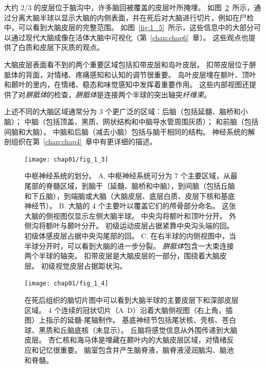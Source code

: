 \begin{proposition}[中枢神经系统的解剖学组织]
	\quad \quad 大约 2/3 的皮层位于脑沟中，许多脑回被覆盖的皮层叶所掩埋。
	如图~\ref{fig:1_4}~所示，通过分离大脑半球以显示大脑的内侧表面，并在死后对大脑进行切片，例如在尸检中，可以看到大脑皮层的完整范围。
	如图~\ref{fig:1_5}~所示，这些信息中的大部分可以通过现代大脑成像在活体大脑中可视化（第~\ref{chap:chap6}~章）。
	这些观点也提供了白质和皮层下灰质的观点。
	
	\quad \quad 大脑皮层表面看不到的两个重要区域包括扣带皮层和岛叶皮层。
	扣带皮层位于胼胝体的背面，对情绪、疼痛感知和认知的调节很重要。
	岛叶皮层埋在额叶、顶叶和颞叶的里内，在情绪、稳态和味觉感知中发挥着重要作用。
	这些内部视图还提供了对\textit{胼胝体}的检查，\textit{胼胝体}是连接两个半球的突出轴突\textit{纤维束}。
	
	\quad \quad 上述不同的大脑区域通常分为 3 个更广泛的区域：后脑（包括延髓、脑桥和小脑）；
	中脑（包括顶盖、黑质、网状结构和中脑导水管周围灰质）；
	和前脑（包括间脑和大脑）。
	中脑和后脑（减去小脑）包括与脑干相同的结构。
	神经系统的解剖组织在第~\ref{chap:chap4}~章中有更详细的描述。
		
\end{proposition}


\begin{figure}[htbp]
	\centering
	\texttt{[image: chap01/fig\_1\_3]}
	\caption{中枢神经系统的划分。
		A. 中枢神经系统可分为 7 个主要区域，从最尾部的脊髓区域，到脑干（延髓、脑桥和中脑），到间脑（包括丘脑和下丘脑），到端脑或大脑（大脑皮层、底层白质、皮层下核和基底神经节）。
		B. 大脑的 4 个主要叶以覆盖它们的颅骨部分命名。
		这张大脑的侧视图仅显示左侧大脑半球。
		中央沟将额叶和顶叶分开。
		外侧沟将额叶与颞叶分开。
		初级运动皮层占据紧靠中央沟头端的回。
		初级体感皮层占据中央沟尾部的回。
		C. 在右半球的内侧视图中，当半球分开时，可以看到大脑的进一步分裂。
		\textit{胼胝体}包含一大束连接两个半球的轴突。
		扣带皮层是大脑皮层的一部分，围绕着大脑皮层。
		初级视觉皮层占据距状沟。}
	\label{fig:1_3}
\end{figure}


\begin{figure}[htbp]
	\centering
	\texttt{[image: chap01/fig\_1\_4]}
	\caption{在死后组织的脑切片图中可以看到大脑半球的主要皮层下和深部皮层区域。
		4 个连续的冠状切片（A–D）沿着大脑侧视图（右上角，插图）上指示的延髓-尾轴制作。
		基底神经节包括尾状核、壳核、苍白球、黑质和丘脑底核（未显示）。
		丘脑将感觉信息从外围传递到大脑皮层。
		杏仁核和海马体是埋藏在颞叶内的大脑皮层区域，对情绪反应和记忆很重要。
		脑室包含并产生脑脊液，脑脊液浸润脑沟、脑池和脊髓\cite{nieuwenhuys2007human}。}
	\label{fig:1_4}
\end{figure}


